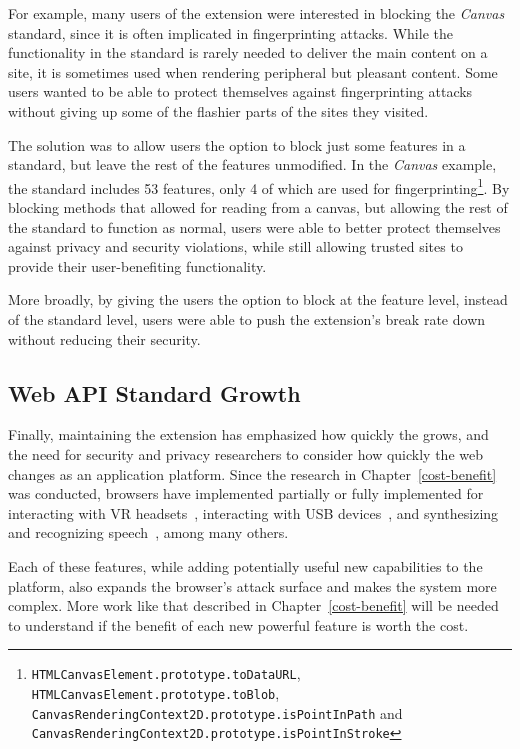 For example, many users of the extension were interested in blocking the
\textit{Canvas} standard, since it is often implicated in fingerprinting attacks.
While the functionality in the standard is rarely needed to deliver the
main content on a site, it is sometimes used when rendering peripheral but
pleasant content.  Some users wanted to be able to protect themselves against
fingerprinting attacks without giving up some of the flashier parts of the sites
they visited.

The solution was to allow users the option to block
just some features in a standard, but leave the rest of the features
unmodified.  In the \textit{Canvas} example, the standard includes 53 features,
only 4 of which are used for fingerprinting\footnote{%
\texttt{HTMLCanvasElement.prototype.toDataURL},
\texttt{HTMLCanvasElement.prototype.toBlob},
\texttt{CanvasRenderingContext2D.prototype.isPointInPath} and
\texttt{CanvasRenderingContext2D.prototype.isPointInStroke}}.  By blocking
methods that allowed for reading from a canvas, but allowing the rest of the
standard to function as normal, users were able to better protect themselves against
privacy and security violations, while still allowing trusted sites to provide
their user-benefiting functionality.

More broadly, by giving the users the option to block at the feature level,
instead of the standard level, users were able to push the extension's break
rate down without reducing their security.


\subsection{Web API Standard Growth}
Finally, maintaining the extension has emphasized how
quickly the \WAPI grows, and the need for security and privacy
researchers to consider how quickly the web changes as an application
platform.  Since the research in Chapter~\ref{cost-benefit} was conducted,
browsers have implemented partially or fully implemented \WASs for interacting
with VR headsets~\cite{webvrstandard}, interacting with USB
devices~\cite{webusbstandard}, and synthesizing and recognizing
speech~\cite{speechtandard}, among many others.

Each of these features, while adding potentially useful new capabilities to the
platform, also expands the browser's attack surface and makes the system more
complex.  More work like that described in Chapter~\ref{cost-benefit} will be
needed to understand if the benefit of each new powerful feature is worth the
cost.
